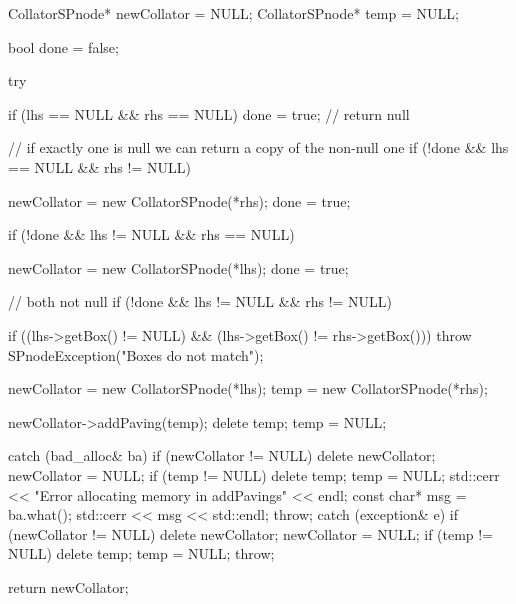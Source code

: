 \begin{DoxyCode}
    {
        CollatorSPnode* newCollator = NULL;
        CollatorSPnode* temp = NULL;

        bool done = false;

        try {

            if (lhs == NULL && rhs == NULL) done = true; // return null

            // if exactly one is null we can return a copy of the non-null one
            if (!done && lhs == NULL && rhs != NULL) {

                newCollator = new CollatorSPnode(*rhs);
                done = true;

            }
            if (!done && lhs != NULL && rhs == NULL) {

                newCollator = new CollatorSPnode(*lhs);
                done = true;
            }
            // both not null
            if (!done && lhs != NULL && rhs != NULL) {

                if ((lhs->getBox() != NULL) &&
                                (lhs->getBox() != rhs->getBox())) {
                    throw SPnodeException("Boxes do not match");
                }

                newCollator = new CollatorSPnode(*lhs);
                temp = new CollatorSPnode(*rhs);

                newCollator->addPaving(temp);
                delete temp;
                temp = NULL;
            }
        }
        catch (bad_alloc& ba) {
            if (newCollator != NULL) {
                delete newCollator;
                newCollator = NULL;
            }
            if (temp != NULL) {
                delete temp;
                temp = NULL;
            }
            std::cerr << "Error allocating memory in addPavings" << endl;
            const char* msg = ba.what();
            std::cerr << msg << std::endl;
            throw;
        }
        catch (exception& e) {
            if (newCollator != NULL) {
                delete newCollator;
                newCollator = NULL;
            }
            if (temp != NULL) {
                delete temp;
                temp = NULL;
            }
            throw;
        }

        return newCollator;
    }
\end{DoxyCode}
